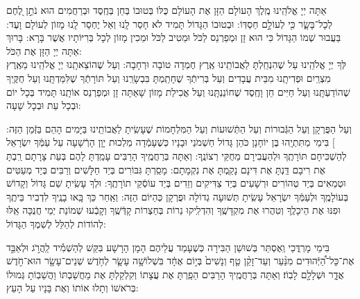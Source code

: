 \documentclass[a4paper, twoside, openany, parskip=half, 10pt]{article}
\begin{document}
\begin{multicols}{2}
אַתָּה יְיָ אֱלֹהֵֽינוּ מֶֽלֶךְ הָעוֹלָם הַזָּן אֶת הָעוֹלָם כֻּלּוֹ בְּטוּבוֹ בְּחֵן בְּחֶֽסֶד וּבְרַחֲמִים הוּא נֹתֵ֣ן לֶ֭חֶם לְכָל־בָּשָׂ֑ר כִּ֖י לְעוֹלָ֣ם חַסְדּֽוֹ: וּבְטוּבוֹ הַגָּדוֹל תָּמִיד לֹא חָסַר לָֽנוּ וְאַל יֶחְסַר לָֽנוּ מָזוֹן לְעוֹלָם וָעֶד: בַּעֲבוּר שְׁמוֹ הַגָּדוֹל כִּי הוּא זָן וּמְפַרְנֵס לַכֹּל וּמֵטִיב לַכֹּל וּמֵכִין מָזוֹן לְכָל בְּרִיּוֹתָיו אֲשֶׁר בָּרָא: בָּרוּךְ אַתָּה יְיָ הַזָּן אֶת הַכֹּל:\\
	
	לְּךָ יְיָ אֱלֹהֵֽינוּ עַל שֶׁהִנְחַֽלְתָּ לַאֲבוֹתֵֽינוּ אֶֽרֶץ חֶמְדָה טוֹבָה וּרְחָבָה: וְעַל שֶׁהוֹצֵאתָֽנוּ יְיָ אֱלֹהֵֽינוּ מֵאֶֽרֶץ מִצְרַֽיִם וּפְדִיתָֽנוּ מִבֵּית עֲבָדִים וְעַל בְּרִיתְֿךָ שֶׁחָתַֽמְתָּ בִּבְשָׂרֵֽנוּ וְעַל תּוֹרָתְֿךָ שֶׁלִּמַּדְתָּֽנוּ וְעַל חֻקֶּֽיךָ שֶׁהוֹדַעְתָּֽנוּ וְעַל חַיִּים חֵן וָחֶֽסֶד שֶׁחוֹנַנְתָּֽנוּ וְעַל אֲכִילַת מָזוֹן שָׁאַתָּה זָן וּמְפַרְנֵס אוֹתָֽנוּ תָּמִיד בְּכָל יוֹם וּבְכָל עֵת וּבְכָל שָׁעָה:\\

\begin{sometimes}
 וְעַל הַפֻּרְקָן וְעַל הַגְּֿבוּרוֹת וְעַל הַתְּֿשׁוּעוֹת וְעַל הַמִּלְחָמוֹת שֶׁעָשִֽׂיתָ לַאֲבוֹתֵֽינוּ בַּיָּמִים הָהֵם בַּזְּֿמַן הַזֶּה:
]
בִּימֵי מַתִּתְיָֽהוּ בֶּן יוֹחָנָן כֹּהֵן גָּדוֹל חַשְׁמֹנַי וּבָנָיו כְּשֶׁעָמְֿדָה מַלְכוּת יָוָן הָרְֿשָׁעָה עַל עַמְּֿךָ יִשְׂרָאֵל לְהַשְׁכִּיחָם תּוֹרָתֶֽךָ וּלְהַעֲבִירָם מֵחֻקֵּי רְצוֹנֶֽךָ: וְאַתָּה בְּרַחֲמֶֽיךָ הָרַבִּים עָמַֽדְתָּ לָהֶם בְּעֵת צָרָתָם רַֽבְתָּ אֶת רִיבָם דַּֽנְתָּ אֶת דִּינָם נָקַֽמְתָּ אֶת נִקְמָתָם: מָסַֽרְתָּ גִּבּוֹרִים בְּיַד חַלָּשִׁים וְרַבִּים בְּיַד מְעַטִּים וּטְמֵאִים בְּיַד טְהוֹרִים וּרְשָׁעִים בְּיַד צַדִּיקִים וְזֵדִים בְּיַד עוֹסְֿקֵי תוֹרָתֶֽךָ: וּלְךָ עָשִֽׂיתָ שֵׁם גָּדוֹל וְקָדוֹשׁ בְּעוֹלָמֶֽךָ וּלְעַמְּֿךָ יִשְׂרָאֵל עָשִֽׂיתָ תְּשׁוּעָה גְדוֹלָה וּפֻרְקָן כְּהַיּוֹם הַזֶּה: וְאַֽחַר כַּךְ בָּֽאוּ בָנֶֽיךָ לִדְבִיר בֵּיתֶֽךָ וּפִנּוּ אֶת הֵיכָלֶֽךָ וְטִהֲרוּ אֶת מִקְדָּשֶֽׁךָ וְהִדְלִֽיקוּ נֵרוֹת בְּחַצְרוֹת קָדְּֿשֶֽׁךָ וְקָבְֿעוּ שְׁמוֹנַת יְמֵי חֲנֻכָּה אֵֽלּוּ לְהוֹדוֹת לְהַלֵּל לְשִׁמְךָ הַגָּדוֹל: 

בִּימֵי מָרְדֳּכַי וְִאֶסְתֵּר בְּשׁוּשַׁן הַבִּירָה כְּשֶׁעָמַד עֲלֵיהֶם הָמָן הָרָשָׁע בִּקֵּשׁ
 לְהַשְׁמִ֡יד לַֽהֲרֹ֣ג וּלְאַבֵּ֣ד אֶת־כָּל־הַ֠יְּֿהוּדִים מִנַּ֨עַר וְעַד־זָקֵ֨ן טַ֤ף וְנָשִׁים֙ בְּי֣וֹם אֶחָ֔ד בִּשְׁלוֹשָׁ֥ה עָשָׂ֛ר לְחֹ֥דֶשׁ שְׁנֵים־עָשָׂ֖ר הוּא־חֹ֣דֶשׁ אֲדָ֑ר וּשְׁלָלָ֖ם לָבֽוֹז׃ וְאַתָּה בְּרַחֲמֶֽיךָ הָרַבִּים הֵפַֽרְתָּ אֶת עֲצָתוֹ וְקִלְקַלְתָּ אֶת מַחֲשַׁבְתּוֹ וַהֲשֵׁבֽוֹתָ גְּמוּלוֹ בְּרֹאשׁוֹ וְתָלוּ אוֹתוֹ וְאֶת בָּנָיו עַל הָעֵץ:

\end{sometimes}


\end{multicols}
\end{document}
